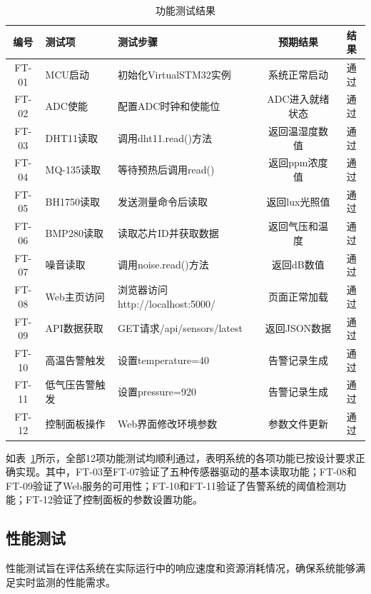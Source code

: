 \documentclass[12pt,a4paper]{ctexart}
\begin{document}
\begin{table}[H]
    \centering
    \caption{功能测试结果}
    \label{tab:functest}
    \begin{tabular}{@{}clp{5cm}cc@{}}
        \toprule
        \textbf{编号} & \textbf{测试项} & \textbf{测试步骤} & \textbf{预期结果} & \textbf{结果} \\
        \midrule
        FT-01 & MCU启动 & 初始化VirtualSTM32实例 & 系统正常启动 & 通过 \\
        FT-02 & ADC使能 & 配置ADC时钟和使能位 & ADC进入就绪状态 & 通过 \\
        FT-03 & DHT11读取 & 调用dht11.read()方法 & 返回温湿度数值 & 通过 \\
        FT-04 & MQ-135读取 & 等待预热后调用read() & 返回ppm浓度值 & 通过 \\
        FT-05 & BH1750读取 & 发送测量命令后读取 & 返回lux光照值 & 通过 \\
        FT-06 & BMP280读取 & 读取芯片ID并获取数据 & 返回气压和温度 & 通过 \\
        FT-07 & 噪音读取 & 调用noise.read()方法 & 返回dB数值 & 通过 \\
        FT-08 & Web主页访问 & 浏览器访问http://localhost:5000/ & 页面正常加载 & 通过 \\
        FT-09 & API数据获取 & GET请求/api/sensors/latest & 返回JSON数据 & 通过 \\
        FT-10 & 高温告警触发 & 设置temperature=40 & 告警记录生成 & 通过 \\
        FT-11 & 低气压告警触发 & 设置pressure=920 & 告警记录生成 & 通过 \\
        FT-12 & 控制面板操作 & Web界面修改环境参数 & 参数文件更新 & 通过 \\
        \bottomrule
    \end{tabular}
\end{table}

如表~\ref{tab:functest}所示，全部12项功能测试均顺利通过，表明系统的各项功能已按设计要求正确实现。其中，FT-03至FT-07验证了五种传感器驱动的基本读取功能；FT-08和FT-09验证了Web服务的可用性；FT-10和FT-11验证了告警系统的阈值检测功能；FT-12验证了控制面板的参数设置功能。

\subsection{性能测试}

性能测试旨在评估系统在实际运行中的响应速度和资源消耗情况，确保系统能够满足实时监测的性能需求。
\end{document}
